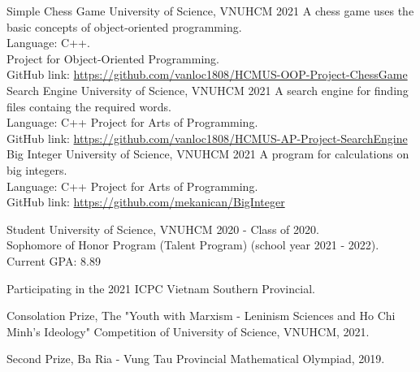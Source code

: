 \documentclass[11pt]{spidercv}
\begin{document}
    \begin{MainPart}

    \Experience
        {\ColorHighlight}
		{Simple Chess Game}
		{University of Science, VNUHCM}
        {2021}
        {   
            A chess game uses the basic concepts of object-oriented 					programming.\\
            Language: C++.\\
            Project for Object-Oriented Programming.\\
            GitHub link: \url{https://github.com/vanloc1808/HCMUS-OOP-Project-ChessGame}
        }
    \Experience
        {\ColorHighlight}
		{Search Engine}
		{University of Science, VNUHCM}
        {2021}
        {   
            A search engine for finding files containg the required words.\\
            Language: C++
            Project for Arts of Programming.\\
            GitHub link:
            \url{https://github.com/vanloc1808/HCMUS-AP-Project-SearchEngine}
        }
    \Experience
        {\ColorHighlight}
		{Big Integer}
		{University of Science, VNUHCM}
        {2021}
        {   
            A program for calculations on big integers.\\
            Language: C++
            Project for Arts of Programming.\\
            GitHub link: 
            \url{https://github.com/mekanican/BigInteger}
        }


    
    \Experience
        {\ColorHighlight}
		{Student}
		{University of Science, VNUHCM}
        {2020 - \faUndo}
        {   
            Class of 2020.\\
            Sophomore of Honor Program (Talent Program) (school year 2021 - 2022).\\
            Current GPA: 8.89
            }

    \vspace*{0.5cm}
        \begin{ItemList}{\ColorHighlight}
            \item [] Participating in the 2021 ICPC Vietnam Southern Provincial.
            \item [] Consolation Prize, The "Youth with Marxism - Leninism Sciences and Ho Chi Minh's Ideology" Competition of University of Science, VNUHCM, 2021.
            \item [] Second Prize, Ba Ria - Vung Tau Provincial Mathematical Olympiad, 2019.
        \end{ItemList}
        

    \end{MainPart}

    
\end{document}
